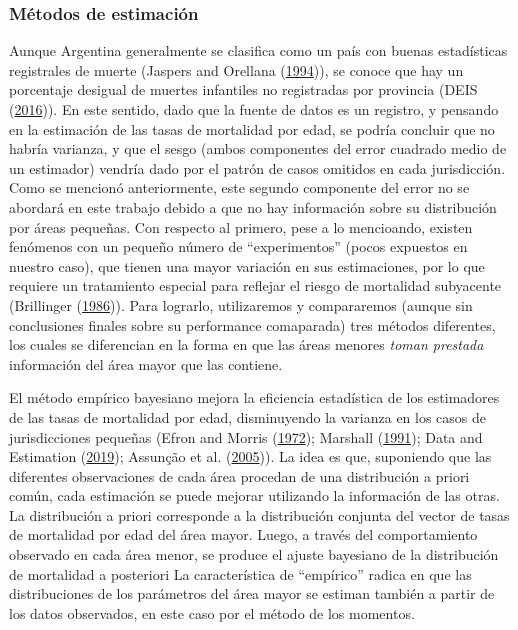 \documentclass[12pt,]{article}
\begin{document}
\hypertarget{muxe9todos-de-estimaciuxf3n}{%
\subsubsection{\texorpdfstring{\textbf{Métodos de
estimación}}{Métodos de estimación}}\label{muxe9todos-de-estimaciuxf3n}}

Aunque Argentina generalmente se clasifica como un país con buenas
estadísticas registrales de muerte (Jaspers and Orellana
(\protect\hyperlink{ref-JaspersOrellana1994}{1994})), se conoce que hay
un porcentaje desigual de muertes infantiles no registradas por
provincia (DEIS (\protect\hyperlink{ref-DEIS2016}{2016})). En este
sentido, dado que la fuente de datos es un registro, y pensando en la
estimación de las tasas de mortalidad por edad, se podría concluir que
no habría varianza, y que el sesgo (ambos componentes del error cuadrado
medio de un estimador) vendría dado por el patrón de casos omitidos en
cada jurisdicción. Como se mencionó anteriormente, este segundo
componente del error no se abordará en este trabajo debido a que no hay
información sobre su distribución por áreas pequeñas. Con respecto al
primero, pese a lo mencioando, existen fenómenos con un pequeño número
de ``experimentos'' (pocos expuestos en nuestro caso), que tienen una
mayor variación en sus estimaciones, por lo que requiere un tratamiento
especial para reflejar el riesgo de mortalidad subyacente (Brillinger
(\protect\hyperlink{ref-Brillinger1986}{1986})). Para lograrlo,
utilizaremos y compararemos (aunque sin conclusiones finales sobre su
performance comaparada) tres métodos diferentes, los cuales se
diferencian en la forma en que las áreas menores \emph{toman prestada}
información del área mayor que las contiene.

El método empírico bayesiano mejora la eficiencia estadística de los
estimadores de las tasas de mortalidad por edad, disminuyendo la
varianza en los casos de jurisdicciones pequeñas (Efron and Morris
(\protect\hyperlink{ref-Efron1972}{1972}); Marshall
(\protect\hyperlink{ref-Marshall1991}{1991}); Data and Estimation
(\protect\hyperlink{ref-Longford2005}{2019}); Assunção et al.
(\protect\hyperlink{ref-Assuncao2005}{2005})). La idea es que,
suponiendo que las diferentes observaciones de cada área procedan de una
distribución a priori común, cada estimación se puede mejorar utilizando
la información de las otras. La distribución a priori corresponde a la
distribución conjunta del vector de tasas de mortalidad por edad del
área mayor. Luego, a través del comportamiento observado en cada área
menor, se produce el ajuste bayesiano de la distribución de mortalidad a
posteriori La característica de ``empírico'' radica en que las
distribuciones de los parámetros del área mayor se estiman también a
partir de los datos observados, en este caso por el método de los
momentos.
\end{document}
